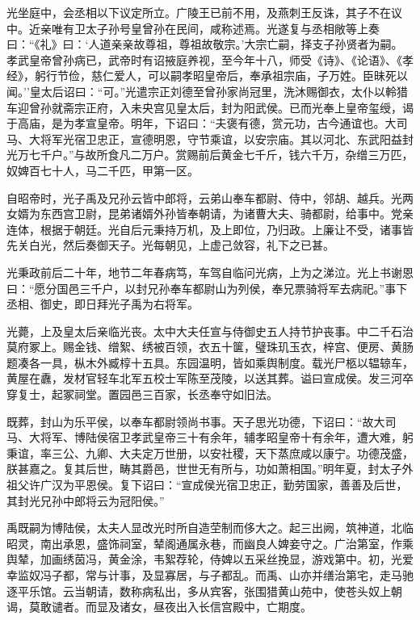 \documentclass[]{article}
\begin{document}
光坐庭中，会丞相以下议定所立。广陵王已前不用，及燕刺王反诛，其子不在议中。近亲唯有卫太子孙号皇曾孙在民间，咸称述焉。光遂复与丞相敞等上奏曰：``《礼》曰：`人道亲亲故尊祖，尊祖故敬宗。'大宗亡嗣，择支子孙贤者为嗣。孝武皇帝曾孙病已，武帝时有诏掖庭养视，至今年十八，师受《诗》、《论语》、《孝经》，躬行节俭，慈仁爱人，可以嗣孝昭皇帝后，奉承祖宗庙，子万姓。臣昧死以闻。''皇太后诏曰：``可。''光遣宗正刘德至曾孙家尚冠里，洗沐赐御衣，太仆以軨猎车迎曾孙就斋宗正府，入未央宫见皇太后，封为阳武侯。已而光奉上皇帝玺绶，谒于高庙，是为孝宣皇帝。明年，下诏曰：``夫褒有德，赏元功，古今通谊也。大司马、大将军光宿卫忠正，宣德明恩，守节乘谊，以安宗庙。其以河北、东武阳益封光万七千户。''与故所食凡二万户。赏赐前后黄金七千斤，钱六千万，杂缯三万匹，奴婢百七十人，马二千匹，甲第一区。

自昭帝时，光子禹及兄孙云皆中郎将，云弟山奉车都尉、侍中，邻胡、越兵。光两女婿为东西宫卫尉，昆弟诸婿外孙皆奉朝请，为诸曹大夫、骑都尉，给事中。党亲连体，根据于朝廷。光自后元秉持万机，及上即位，乃归政。上廉让不受，诸事皆先关白光，然后奏御天子。光每朝见，上虚己敛容，礼下之已甚。

光秉政前后二十年，地节二年春病笃，车驾自临问光病，上为之涕泣。光上书谢恩曰：``愿分国邑三千户，以封兄孙奉车都尉山为列侯，奉兄票骑将军去病祀。''事下丞相、御史，即日拜光子禹为右将军。

光薨，上及皇太后亲临光丧。太中大夫任宣与侍御史五人持节护丧事。中二千石治莫府冢上。赐金钱、缯絮、绣被百领，衣五十箧，璧珠玑玉衣，梓宫、便房、黄肠题凑各一具，枞木外臧椁十五具。东园温明，皆如乘舆制度。载光尸柩以辒辌车，黄屋在纛，发材官轻车北军五校士军陈至茂陵，以送其葬。谥曰宣成侯。发三河卒穿复士，起冢祠堂。置园邑三百家，长丞奉守如旧法。

既葬，封山为乐平侯，以奉车都尉领尚书事。天子思光功德，下诏曰：``故大司马、大将军、博陆侯宿卫孝武皇帝三十有余年，辅孝昭皇帝十有余年，遭大难，躬秉谊，率三公、九卿、大夫定万世册，以安社稷，天下蒸庶咸以康宁。功德茂盛，朕甚嘉之。复其后世，畴其爵邑，世世无有所与，功如萧相国。''明年夏，封太子外祖父许广汉为平恩侯。复下诏曰：``宣成侯光宿卫忠正，勤劳国家，善善及后世，其封光兄孙中郎将云为冠阳侯。''

禹既嗣为博陆侯，太夫人显改光时所自造茔制而侈大之。起三出阙，筑神道，北临昭灵，南出承恩，盛饰祠室，辇阁通属永巷，而幽良人婢妾守之。广治第室，作乘舆辇，加画绣茵冯，黄金涂，韦絮荐轮，侍婢以五采丝挽显，游戏第中。初，光爱幸监奴冯子都，常与计事，及显寡居，与子都乱。而禹、山亦并缮治第宅，走马驰逐平乐馆。云当朝请，数称病私出，多从宾客，张围猎黄山苑中，使苍头奴上朝谒，莫敢谴者。而显及诸女，昼夜出入长信宫殿中，亡期度。
\end{document}
